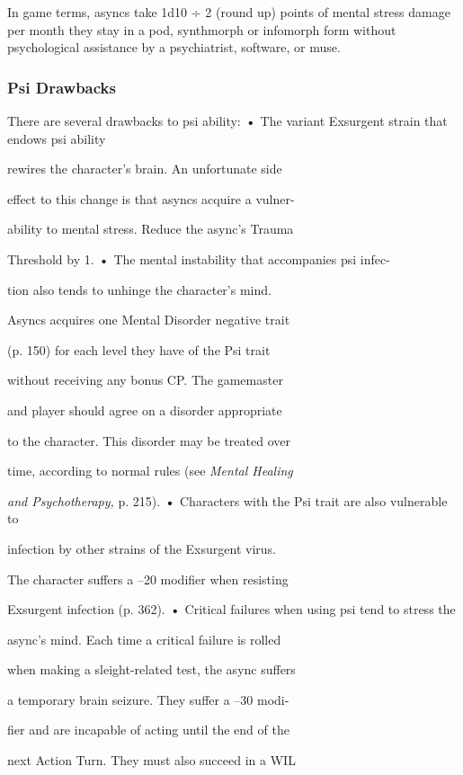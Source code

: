 In game terms, asyncs take 1d10 ÷ 2 (round up) 
points of mental stress damage per month they stay 
in a pod, synthmorph or infomorph form without 
psychological assistance by a psychiatrist, software, 
or muse.

\subsubsection{Psi Drawbacks}

There are several drawbacks to psi ability:
\textbf{•  }The variant Exsurgent strain that endows psi ability 

rewires the character's brain. An unfortunate side 

effect to this change is that asyncs acquire a vulner-

ability to mental stress. Reduce the async's Trauma 

Threshold by 1.
\textbf{•  }The mental instability that accompanies psi infec-

tion also tends to unhinge the character's mind. 

Asyncs acquires one Mental Disorder negative trait 

(p. 150) for each level they have of the Psi trait 

without receiving any bonus CP. The gamemaster 

and player should agree on a disorder appropriate 

to the character. This disorder may be treated over 

time, according to normal rules (see\textit{ Mental Healing }

\textit{and Psychotherapy, }p. 215).
\textbf{•  }Characters with the Psi trait are also vulnerable to 

infection by other strains of the Exsurgent virus. 

The character suffers a –20 modifier when resisting 

Exsurgent infection (p. 362).
\textbf{•  }Critical failures when using psi tend to stress the 

async's mind. Each time a critical failure is rolled 

when making a sleight-related test, the async suffers 

a temporary brain seizure. They suffer a –30 modi-

fier and are incapable of acting until the end of the 

next Action Turn. They must also succeed in a WIL 

